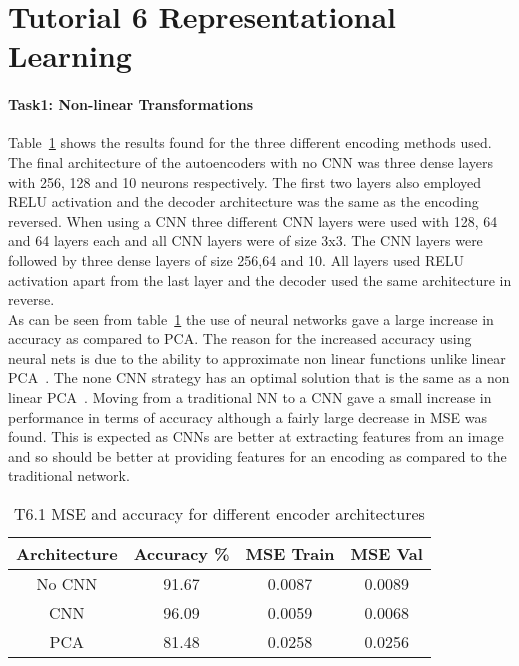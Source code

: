 \documentclass[10pt,twocolumn,letterpaper]{article}
\begin{document}
\section{Tutorial 6 Representational Learning}

\paragraph{Task1: Non-linear Transformations}


Table~\ref*{table:t61} shows the results found for the three different encoding methods used. The final architecture of the autoencoders with no CNN was three dense layers with 256, 128 and 10 neurons respectively. The first two layers also employed RELU activation and the decoder architecture was the same as the encoding reversed. When using a CNN three different CNN layers were used with 128, 64 and 64 layers each and all CNN layers were of size 3x3. The CNN layers were followed by three dense layers of size 256,64 and 10. All layers used RELU activation apart from the last layer and the decoder used the same architecture in reverse. \\
As can be seen from table~\ref*{table:t61} the use of neural networks gave a large increase in accuracy as compared to PCA. The reason for the increased accuracy using neural nets is due to the ability to approximate non linear functions unlike linear PCA~\cite{pca}. The none CNN strategy has an optimal solution that is the same as a non linear PCA~\cite{pca}. Moving from a traditional NN to a CNN gave a small increase in performance in terms of accuracy although a fairly large decrease in MSE was found. This is expected as CNNs are better at extracting features from an image and so should be better at providing features for an encoding as compared to the traditional network.  

\begin{table}[ht]
    \small
    \centering
    \begin{tabular}{|c|c|c|c|}
        \hline
        Architecture     & Accuracy \% & MSE Train & MSE Val \\
        \hline
        No CNN & 91.67   & 0.0087 & 0.0089        \\
        CNN  & 96.09  & 0.0059 &   0.0068       \\
        PCA &  81.48  &  0.0258  &   0.0256   \\
        \hline
    \end{tabular}
    \medbreak
    \caption{T6.1 MSE and accuracy for different encoder architectures}
    \label{table:t61}
    \vspace{-0.8cm}
\end{table}
\end{document}

